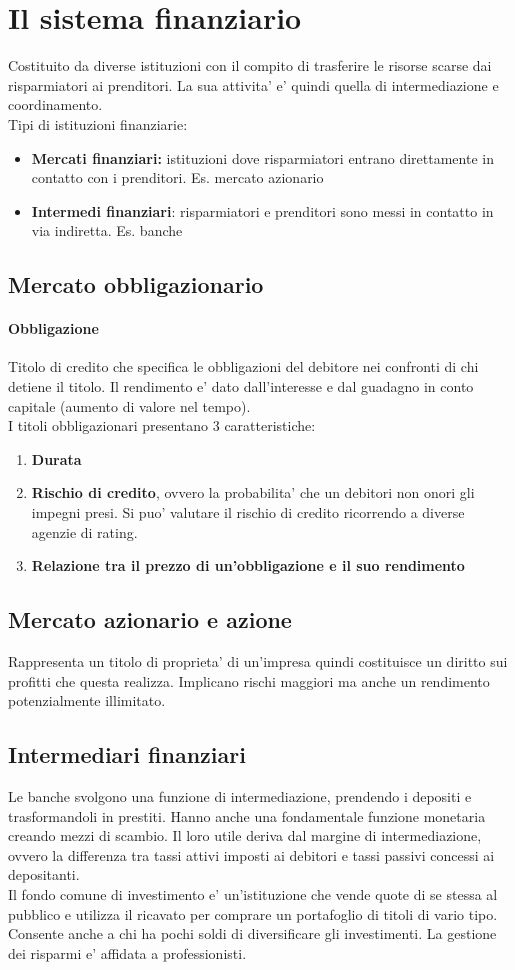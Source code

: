 \documentclass{report}
\begin{document}
	\section{Il sistema finanziario}
	Costituito da diverse istituzioni con il compito di trasferire le risorse scarse dai risparmiatori ai prenditori. La sua attivita' e' quindi quella di intermediazione e coordinamento.
	\medskip \\
	Tipi di istituzioni finanziarie:
	\begin{itemize}
		\item \textbf{Mercati finanziari:} istituzioni dove risparmiatori entrano direttamente in contatto con i prenditori. Es. mercato azionario
		\item \textbf{Intermedi finanziari}: risparmiatori e prenditori sono messi in contatto in via indiretta. Es. banche
	\end{itemize}
	\subsection{Mercato obbligazionario}
	\paragraph{Obbligazione} Titolo di credito che specifica le obbligazioni del debitore nei confronti di chi detiene il titolo. Il rendimento e' dato dall'interesse e dal guadagno in conto capitale (aumento di valore nel tempo).
	\medskip \\I titoli obbligazionari presentano 3 caratteristiche:
	\begin{enumerate}
		\item \textbf{Durata}
		\item \textbf{Rischio di credito}, ovvero la probabilita' che un debitori non onori gli impegni presi. Si puo' valutare il rischio di credito ricorrendo a diverse agenzie di rating.
		\item \textbf{Relazione tra il prezzo di un'obbligazione e il suo rendimento}
	\end{enumerate}
	\subsection{Mercato azionario e azione} Rappresenta un titolo di proprieta' di un'impresa quindi costituisce un diritto sui profitti che questa realizza. Implicano rischi maggiori ma anche un rendimento potenzialmente illimitato.
	\subsection{Intermediari finanziari}
	Le banche svolgono una funzione di intermediazione, prendendo i depositi e trasformandoli in prestiti. Hanno anche una fondamentale funzione monetaria creando mezzi di scambio. Il loro utile deriva dal margine di intermediazione, ovvero la differenza tra tassi attivi imposti ai debitori e tassi passivi concessi ai depositanti.
	\medskip \\Il fondo comune di investimento e' un'istituzione che vende quote di se stessa al pubblico e utilizza il ricavato per comprare un portafoglio di titoli di vario tipo. Consente anche a chi ha pochi soldi di diversificare gli investimenti. La gestione dei risparmi e' affidata a professionisti.
\end{document}
